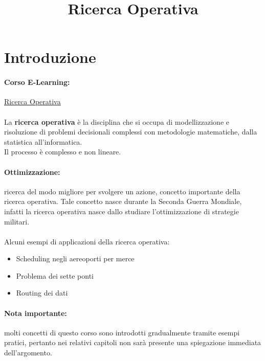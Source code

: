 \documentclass[12pt,a4paper]{article}
\title{Ricerca Operativa}
\author{}
\date{}
\let\oldsection\section
\renewcommand{\section}{\clearpage\oldsection}
\begin{document}
\maketitle
\tableofcontents

\section{Introduzione}

\paragraph{Corso E-Learning:} \href{https:/elearning.di.unipi.it/course/view.php?id=1115}{Ricerca Operativa}\\\\
La \textbf{ricerca operativa} è la disciplina che si occupa di modellizzazione e risoluzione di problemi decisionali complessi con metodologie matematiche, dalla statistica all'informatica.\\
Il processo è complesso e non lineare.
\paragraph{Ottimizzazione:} ricerca del modo migliore per svolgere un azione, concetto importante della ricerca operativa. Tale concetto nasce durante la Seconda Guerra Mondiale, infatti la ricerca operativa nasce dallo studiare l'ottimizzazione di strategie militari.\\\\
Alcuni esempi di applicazioni della ricerca operativa:
\begin{itemize}
    \item Scheduling negli aereoporti per merce
    \item Problema dei sette ponti
    \item Routing dei dati
\end{itemize}
\paragraph{Nota importante:} molti concetti di questo corso sono introdotti gradualmente tramite esempi pratici, pertanto nei relativi capitoli non sarà presente una spiegazione immediata dell'argomento.
\end{document}
